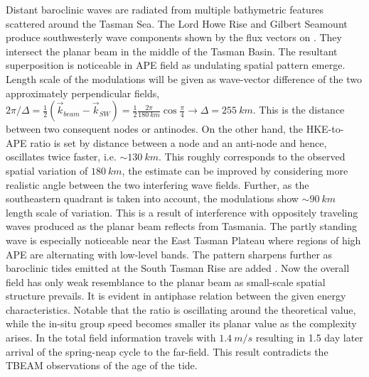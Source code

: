 \documentclass[12pt]{article}
\begin{document}
Distant baroclinic waves are radiated from multiple bathymetric features scattered around the 
Tasman Sea. The Lord Howe Rise and Gilbert Seamount  produce southwesterly 
wave 
components shown by the flux vectors on . They intersect the planar 
beam in the middle of the Tasman Basin. The resultant superposition is noticeable in APE field 
 as undulating spatial pattern emerge. Length scale of the modulations 
will be given as wave-vector difference of the two approximately perpendicular fields, $2 
\pi/\Delta = \frac{1}{2} (\vec{k}_{beam} - \vec{k}_{SW}) = \frac{1}{2} \frac{2 \pi}{180~km} \cos 
\frac{\pi}{4} \rightarrow  \Delta = 255~km$. This is the distance between two consequent nodes or 
antinodes. On the other hand, the HKE-to-APE ratio is set by distance between a node and an 
anti-node and hence, oscillates twice faster, i.e. $\sim 130~km$. This roughly corresponds to the 
observed spatial variation of $180~km$, the estimate can be improved by considering more realistic 
angle between the two interfering wave fields. Further, as the southeastern quadrant 
 is taken into account, the modulations show $\sim 90~km$ length scale 
of variation. This is a result of interference with oppositely traveling waves produced as the 
planar beam reflects from Tasmania. The partly standing wave is especially noticeable near the East 
Tasman Plateau where regions of high APE are alternating with low-level bands. The pattern sharpens 
further as baroclinic tides emitted at the South Tasman Rise are added 
. 
Now the overall field has only weak resemblance to the planar beam as small-scale spatial structure 
prevails. It is evident in antiphase relation between the given energy characteristics. Notable 
that the ratio is oscillating around the theoretical value, while the in-situ group speed becomes 
smaller its planar value as the complexity arises. In the total field information travels with 
$1.4~m/s$ resulting in 1.5 day later arrival of the spring-neap cycle to the far-field. This result 
contradicts the TBEAM observations of the age of the tide.\\
\end{document}

